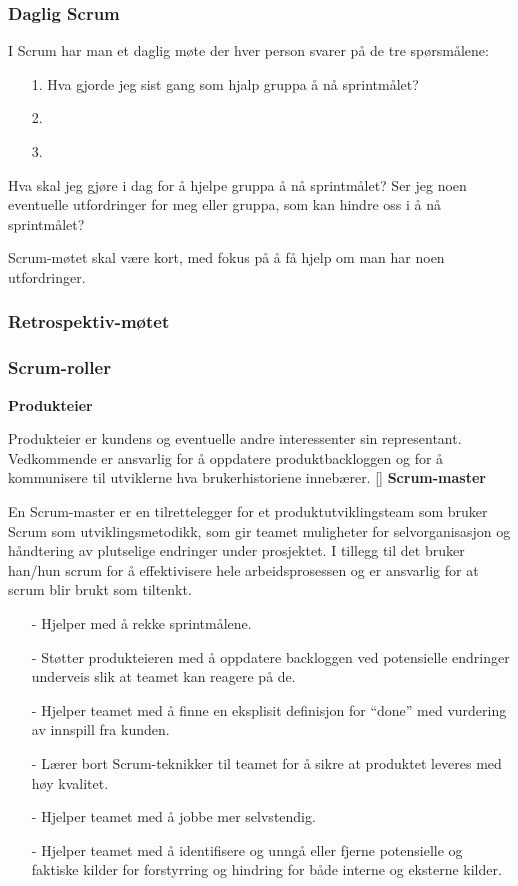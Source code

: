 \documentclass[12pt,a4paper,norsk]{article}
\begin{document}
	\subsubsection{Daglig Scrum}
	I Scrum har man et daglig møte der hver person svarer på de tre spørsmålene:
	\begin{itemize}
    \item[1.] Hva gjorde jeg sist gang som hjalp gruppa å nå sprintmålet?
    \item[2.] 
    \item[3.]   
    \end{itemize}

Hva skal jeg gjøre i dag for å hjelpe gruppa å nå sprintmålet?
Ser jeg noen eventuelle utfordringer for meg eller gruppa, som kan hindre oss i å nå sprintmålet?

Scrum-møtet skal være kort, med fokus på å få hjelp om man har noen utfordringer.
	\subsubsection{Retrospektiv-møtet}
	\subsubsection{Scrum-roller}\label{scrumroller}
	\textbf {Produkteier}
    \par Produkteier er kundens og eventuelle andre interessenter sin representant. Vedkommende er ansvarlig for å oppdatere  produktbackloggen og for å kommunisere til utviklerne hva brukerhistoriene innebærer.
    [\cite{scrumguides}]
    \textbf {Scrum-master}
    \par En Scrum-master er en tilrettelegger for et produktutviklingsteam som bruker Scrum som utviklingsmetodikk, som gir teamet muligheter for selvorganisasjon og håndtering av plutselige endringer under prosjektet. I tillegg til det bruker han/hun scrum for å effektivisere hele arbeidsprosessen og er ansvarlig for at scrum blir brukt som tiltenkt.
 
    \begin{itemize}
    \item[-] Hjelper med å rekke sprintmålene.
    \item[-] Støtter produkteieren med å oppdatere backloggen ved potensielle endringer underveis slik at teamet kan reagere på de.
    \item[-]  Hjelper teamet med å finne en eksplisit definisjon for “done” med vurdering av innspill fra kunden.
    \item[-]  Lærer bort Scrum-teknikker til teamet for å sikre at produktet leveres med høy kvalitet.
    \item[-]  Hjelper teamet med å jobbe mer selvstendig.
    \item[-]  Hjelper teamet med å identifisere og unngå eller fjerne             potensielle og faktiske kilder for forstyrring og hindring for både interne og eksterne kilder.
    \end{itemize}
    
\end{document}
